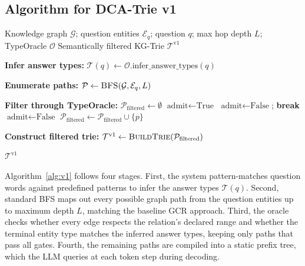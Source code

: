 \subsection{Algorithm for DCA-Trie v1}

\begin{algorithm}[H]
  \caption{DCA-Trie v1: Static Symbolic Filtering at Construction Time}
  \label{alg:v1}
  \small
  \begin{algorithmic}[1]
    \Require Knowledge graph $\mathcal{G}$; question entities $\mathcal{E}_q$;
    question $q$; max hop depth $L$; TypeOracle $\mathcal{O}$
    \Ensure Semantically filtered KG-Trie $\mathcal{T}^{\text{v1}}$

    \State \textbf{Infer answer types:}
    $\mathcal{T}(q) \gets \mathcal{O}.\text{infer\_answer\_types}(q)$

    \State \textbf{Enumerate paths:}
    $\mathcal{P} \gets \textsc{BFS}(\mathcal{G}, \mathcal{E}_q, L)$

    \State \textbf{Filter through TypeOracle:}
    $\mathcal{P}_{\text{filtered}} \gets \emptyset$
    \State $\text{admit} \gets \text{True}$
    \State $\text{admit} \gets \text{False}$; \textbf{break}
    \EndIf
    \EndFor
    \State $\text{admit} \gets \text{False}$
    \EndIf
    \State $\mathcal{P}_{\text{filtered}} \gets \mathcal{P}_{\text{filtered}} \cup \{p\}$
    \EndIf
    \EndFor

    \State \textbf{Construct filtered trie:}
    $\mathcal{T}^{\text{v1}} \gets \textsc{BuildTrie}(\mathcal{P}_{\text{filtered}})$

    \State \Return $\mathcal{T}^{\text{v1}}$
  \end{algorithmic}
\end{algorithm}

Algorithm~\ref{alg:v1} follows four stages. First, the system pattern-matches question words against predefined patterns to infer the answer types $\mathcal{T}(q)$. Second, standard BFS maps out every possible graph path from the question entities up to maximum depth $L$, matching the baseline GCR approach. Third, the oracle checks whether every edge respects the relation's declared range and whether the terminal entity type matches the inferred answer types, keeping only paths that pass all gates. Fourth, the remaining paths are compiled into a static prefix tree, which the LLM queries at each token step during decoding.

